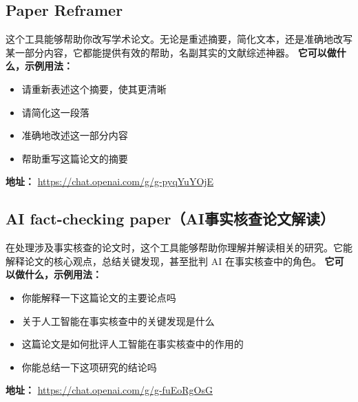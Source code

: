 \subsection{Paper Reframer}
这个工具能够帮助你改写学术论文。无论是重述摘要，简化文本，还是准确地改写某一部分内容，它都能提供有效的帮助，名副其实的文献综述神器。
\textbf{它可以做什么，示例用法：}
\begin{itemize}
    \item 请重新表述这个摘要，使其更清晰
    \item 请简化这一段落
    \item 准确地改述这一部分内容
    \item 帮助重写这篇论文的摘要
\end{itemize}
\textbf{地址：} \url{https://chat.openai.com/g/g-pyqYuYOjE}

\subsection{AI fact-checking paper（AI事实核查论文解读）}
在处理涉及事实核查的论文时，这个工具能够帮助你理解并解读相关的研究。它能解释论文的核心观点，总结关键发现，甚至批判 AI 在事实核查中的角色。
\textbf{它可以做什么，示例用法：}
\begin{itemize}
    \item 你能解释一下这篇论文的主要论点吗
    \item 关于人工智能在事实核查中的关键发现是什么
    \item 这篇论文是如何批评人工智能在事实核查中的作用的
    \item 你能总结一下这项研究的结论吗
\end{itemize}
\textbf{地址：} \url{https://chat.openai.com/g/g-fuEoRgOsG}
